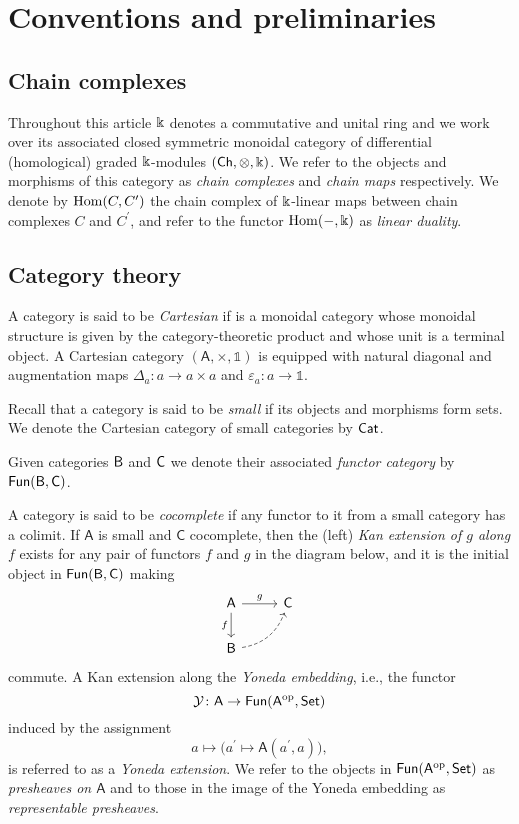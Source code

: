 
\section{Conventions and preliminaries} \label{s:preliminaries}

\subsection{Chain complexes }

Throughout this article $\Bbbk$ denotes a commutative and unital ring and we work over its associated closed symmetric monoidal category of differential (homological) graded $\Bbbk$-modules $(\mathsf{Ch}, \otimes, \Bbbk)$.
We refer to the objects and morphisms of this category as \textit{chain complexes} and \textit{chain maps} respectively. We denote by $\mathrm{Hom}(C, C^\prime)$ the chain complex of $\Bbbk$-linear maps between chain complexes $C$ and $C^\prime$, and refer to the functor $\mathrm{Hom}(-, \Bbbk)$ as \textit{linear duality}.

\subsection{Category theory}

A category is said to be \textit{Cartesian} if is a monoidal category whose monoidal structure is given by the category-theoretic product and whose unit is a terminal object.
A Cartesian category $(\mathsf{A}, \times, \mathbb{1})$ is equipped with natural diagonal and augmentation maps $\Delta_a \colon a \to a \times a$ and $\varepsilon_a \colon a \to \mathbb{1}$.

Recall that a category is said to be \textit{small} if its objects and morphisms form sets.
We denote the Cartesian category of small categories by $\mathsf{Cat}$.

Given categories $\mathsf{B}$ and $\mathsf{C}$ we denote their associated \textit{functor category} by $\mathsf{Fun}(\mathsf{B}, \mathsf{C})$.

A category is said to be \textit{cocomplete} if any functor to it from a small category has a colimit.
If $\mathsf{A}$ is small and $\mathsf{C}$ cocomplete, then the (left) \textit{Kan extension of $g$ along $f$} exists for any pair of functors $f$ and $g$ in the diagram below, and it is the initial object in $\mathsf{Fun}(\mathsf{B}, \mathsf{C})$ making
\begin{equation*}
\begin{tikzcd}[column sep=normal, row sep=normal]
\mathsf{A} \arrow[d, "f"'] \arrow[r, "g"] & \mathsf{C} \\
\sB \arrow[dashed, ur, bend right] & \quad
\end{tikzcd}
\end{equation*}
commute.
A Kan extension along the \textit{Yoneda embedding}, i.e., the functor
\[
\mathcal{Y} \colon \mathsf{A} \to \mathsf{Fun}(\mathsf{A}^{\mathrm{op}}, \mathsf{Set})
\]
induced by the assignment
\[
a \mapsto \big( a^\prime \mapsto \mathsf{A}(a^\prime, a) \big),
\]
is referred to as a \textit{Yoneda extension}.
We refer to the objects in $\mathsf{Fun}(\mathsf{A}^{\mathrm{op}}, \mathsf{Set})$ as \textit{presheaves on $\mathsf{A}$} and to those in the image of the Yoneda embedding as \textit{representable presheaves}.

